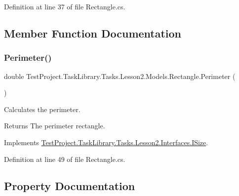 Definition at line 37 of file Rectangle.\+cs.



\subsection{Member Function Documentation}
\mbox{\label{struct_test_project_1_1_task_library_1_1_tasks_1_1_lesson2_1_1_models_1_1_rectangle_a8a4e6ef021013964d15b6c2fb906a1d1}} 
\subsubsection{\texorpdfstring{Perimeter()}{Perimeter()}}
{\footnotesize\ttfamily double Test\+Project.\+Task\+Library.\+Tasks.\+Lesson2.\+Models.\+Rectangle.\+Perimeter (\begin{DoxyParamCaption}{ }\end{DoxyParamCaption})}



Calculates the perimeter. 

\begin{DoxyReturn}{Returns}
The perimeter rectangle.
\end{DoxyReturn}


Implements \mbox{\hyperlink{interface_test_project_1_1_task_library_1_1_tasks_1_1_lesson2_1_1_interfaces_1_1_i_size_ae71775505cb328d37ab5d5bc16fc79c7}{Test\+Project.\+Task\+Library.\+Tasks.\+Lesson2.\+Interfaces.\+I\+Size}}.



Definition at line 49 of file Rectangle.\+cs.



\subsection{Property Documentation}
\mbox{\label{struct_test_project_1_1_task_library_1_1_tasks_1_1_lesson2_1_1_models_1_1_rectangle_a579437d2c197b3dd47b599b0717eb244}} 
